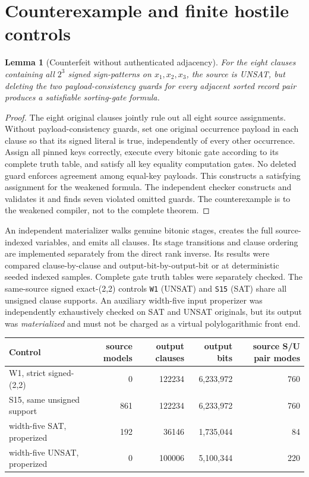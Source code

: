 \documentclass[11pt]{article}
\newtheorem{lemma}[theorem]{Lemma}
\begin{document}
\section{Counterexample and finite hostile controls}
\begin{lemma}[Counterfeit without authenticated adjacency]
For the eight clauses containing all $2^3$ signed sign-patterns on
$x_1,x_2,x_3$, the source is UNSAT, but deleting the two payload-consistency
guards for every adjacent sorted record pair produces a satisfiable
sorting-gate formula.
\end{lemma}
\begin{proof}
The eight original clauses jointly rule out all eight source assignments.
Without payload-consistency guards, set one original occurrence payload in
each clause so that its signed literal is true, independently of every other
occurrence. Assign all pinned keys correctly, execute every bitonic gate
according to its complete truth table, and satisfy all key equality
computation gates. No deleted guard enforces agreement among equal-key
payloads. This constructs a satisfying assignment for the weakened formula.
The independent checker constructs and validates it and finds seven
violated omitted guards. The counterexample is to the weakened compiler,
not to the complete theorem.
\end{proof}

An independent materializer walks genuine bitonic stages, creates the full
source-indexed variables, and emits all clauses. Its stage transitions and
clause ordering are implemented separately from the direct rank inverse.
Its results were compared clause-by-clause and output-bit-by-output-bit or
at deterministic seeded indexed samples. Complete gate truth tables were
separately checked. The same-source signed exact-(2,2) controls \texttt{W1}
(UNSAT) and \texttt{S15} (SAT) share all unsigned clause supports.
An auxiliary width-five input properizer was independently exhaustively
checked on SAT and UNSAT originals, but its output was \emph{materialized}
and must not be charged as a virtual polylogarithmic front end.

\begin{center}
\begin{tabular}{lrrrr}
\toprule
Control&source models&output clauses&output bits&source S/U pair modes\\
\midrule
W1, strict signed-(2,2)&0&122234&6,233,972&760\\
S15, same unsigned support&861&122234&6,233,972&760\\
width-five SAT, properized&192&36146&1,735,044&84\\
width-five UNSAT, properized&0&100006&5,100,344&220\\
\bottomrule
\end{tabular}
\end{center}
\end{document}
